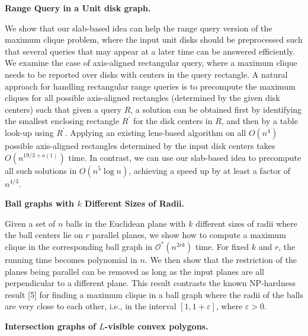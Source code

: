 \par
\par
\par
\par\medskip\noindent\textbf{Range Query in a Unit disk graph.}\par
We show that our slab-based idea can help the range query version of the maximum clique problem, where the input unit disks should be preprocessed such that several queries that may appear at a later time can be answered efficiently. We examine the case of axis-aligned rectangular query, where a maximum clique needs to be reported over disks with centers in the query rectangle. A natural approach for handling rectangular range queries is to precompute the maximum cliques for all possible axis-aligned rectangles (determined by the given disk centers) such that given a query $R$, a solution can be obtained first by identifying the smallest enclosing rectangle $R^{\prime}$ for the disk centers in $R$, and then by a table look-up using $R^{\prime}$. Applying an existing lens-based algorithm on all $O(n^{4})$ possible axis-aligned rectangles determined by the input disk centers takes $O(n^{19/3+o(1)})$ time. In contrast, we can use our slab-based idea to precompute all such solutions in $O(n^{5}\log n)$, achieving a speed up by at least a factor of $n^{4/3}$.
\par
\par
\par
\par\medskip\noindent\textbf{Ball graphs with $k$ Different Sizes of Radii.}\par
Given a set of $n$ balls in the Euclidean plane with $k$ different sizes of radii where the ball centers lie on $r$ parallel planes, we show how to compute a maximum clique in the corresponding ball graph in $\mathcal{O}^{*}(n^{2rk})$ time. For fixed $k$ and $r$, the running time becomes polynomial in $n$. We then show that the restriction of the planes being parallel can be removed as long as the input planes are all perpendicular to a different plane. This result contrasts the known NP-hardness result [5] for finding a maximum clique in a ball graph where the radii of the balls are very close to each other, i.e., in the interval $[1,1+\varepsilon]$, where $\varepsilon>0$.
\par
\par
\par
\par\medskip\noindent\textbf{Intersection graphs of $L$-visible convex polygons.}\par
